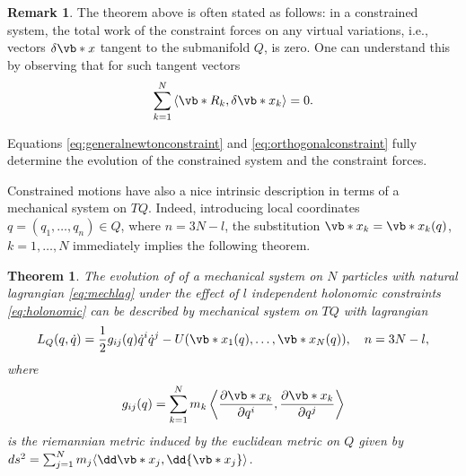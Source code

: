 \documentclass[english,fontsize=11pt,paper=b5]{scrbook}
\newtheorem{theorem}{Theorem}[chapter]
\theoremstyle{definition}
\newtheorem{remark}{Remark}[chapter]
\begin{document}
    \begin{remark}
      The theorem above is often stated as follows: in a constrained system, the total work of the constraint forces on any virtual variations, i.e., vectors $\delta\vb*{x}$ tangent to the submanifold $Q$, is zero.
      One can understand this by observing that for such tangent vectors
      \begin{equation}\label{eq:orthogonalconstraint}
        \sum_{k=1}^N \left\langle\vb*{R}_k, \delta\vb*{x}_k\right\rangle = 0.
      \end{equation}
    \end{remark}

    Equations \eqref{eq:generalnewtonconstraint} and \eqref{eq:orthogonalconstraint} fully determine the evolution of the constrained system and the constraint forces.

    Constrained motions have also a nice intrinsic description in terms of a mechanical system on $TQ$. Indeed, introducing local coordinates $q= (q_1, \ldots, q_n)\in Q$, where $n = 3N-l$, the substitution $\vb*{x}_k = \vb*{x}_k(q)$, $k=1,\ldots,N$ immediately implies the following theorem.

    \begin{theorem}
      The evolution of of a mechanical system on $N$ particles with natural lagrangian \eqref{eq:mechlag} under the effect of $l$ independent holonomic constraints \eqref{eq:holonomic} can be described by mechanical system on $TQ$ with lagrangian
      \begin{equation}
        L_Q(q,\dot q) = \frac12 g_{ij}(q)\dot q^i \dot q^j - U(\vb*{x}_1(q),\ldots,\vb*{x}_N(q)), \quad n = 3N-l,
      \end{equation}
      where
      \begin{equation}
        g_{ij}(q) = \sum_{k=1}^N m_k\left\langle\frac{\partial \vb*{x}_k}{\partial q^i},\frac{\partial \vb*{x}_k}{\partial q^j}\right\rangle
      \end{equation}
      is the riemannian metric induced by the euclidean metric on $Q$ given by
      $ds^2 = \sum_{j=1}^N m_j\langle\dd \vb*{x}_j, \dd{\vb*{x}_j}\rangle$.
    \end{theorem}
\end{document}
